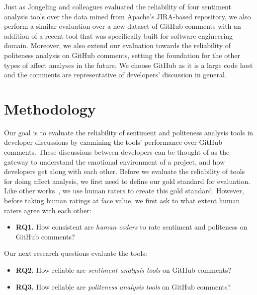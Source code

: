 Just as Jongeling and colleagues evaluated the reliability of four sentiment analysis tools over the data mined from Apache's JIRA-based repository, we also perform a similar evaluation over a new dataset of GitHub comments with an addition of a recent tool that was specifically built for software engineering domain. Moreover, we also extend our evaluation towards the reliability of politeness analysis on GitHub comments, setting the foundation for the other types of affect analyses in the future. 
We choose GitHub
as it is a large code host and 
the comments are representative of developers' discussion in general.  
   

\section{Methodology}

Our goal is to evaluate the reliability of sentiment and politeness analysis tools in developer discussions by examining the tools' performance over GitHub comments.
These discussions between developers can be thought of as the gateway to understand the emotional environment of a project, and how developers get along with each other. 
Before we evaluate the reliability of tools for doing affect analysis,
we first need to define our gold standard for evaluation.
Like other works~\cite{calefato2017sentiment,ahmed2017senticr}, we use human raters to create
this gold standard.
However, before taking human ratings at face value, we first ask
to what extent human raters agree with each other:

\begin{itemize}

\item\textbf{RQ1.} How consistent are \emph{human coders} to rate sentiment and politeness on GitHub comments?

\end{itemize}

\noindent
Our next research questions evaluate the tools:

\begin{itemize}

\item\textbf{RQ2.} How reliable are \emph{sentiment analysis tools} on GitHub comments?

\item\textbf{RQ3.} How reliable are \emph{politeness analysis tools} on GitHub comments? 

\end{itemize}

